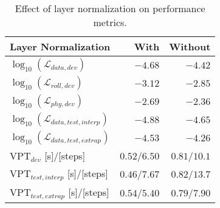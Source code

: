 \begin{table}[!b]
\centering
\caption{Effect of layer normalization on performance metrics.}
\label{tab:layer_norm}
\begin{tabular}{l|r|r|}
\textbf{Layer Normalization}                & \textbf{With} & \textbf{Without} \\ \hline
$\log_{10}(\mathcal{L}_{data,dev})$         & $\bm{-4.68}$  & $-4.42$          \\ \hline
$\log_{10}(\mathcal{L}_{roll,dev})$         & $\bm{-3.12}$  & $-2.85$          \\ \hline
$\log_{10}(\mathcal{L}_{phy,dev})$          & $\bm{-2.69}$  & $-2.36$          \\ \hline
$\log_{10}(\mathcal{L}_{data,test,interp})$ & $\bm{-4.88}$  & $-4.65$          \\ \hline
$\log_{10}(\mathcal{L}_{data,test,extrap})$ & $\bm{-4.53}$  & $-4.26$          \\ \hline
$\text{VPT}_{dev}$ [s]/[steps]              & $0.52$/$6.50$ & $\bm{0.81}$/$10.1$ \\ \hline
$\text{VPT}_{test,interp}$ [s]/[steps]      & $0.46$/$7.67$ & $\bm{0.82}$/$13.7$ \\ \hline
$\text{VPT}_{test,extrap}$ [s]/[steps]      & $0.54$/$5.40$ & $\bm{0.79}$/$7.90$ 
\end{tabular}
\end{table}